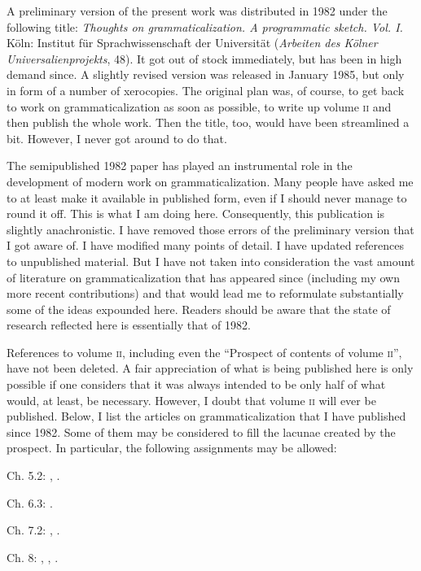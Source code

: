 
A preliminary version of the present work was distributed in 1982 under the following title: \textit{Thoughts on grammaticalization. A programmatic sketch. Vol. I.} Köln: Institut für Sprachwissenschaft der Universität (\textit{Arbeiten des Kölner Universalienprojekts}, 48). It got out of stock immediately, but has been in high demand since. A slightly revised version was released in January 1985, but only in form of a number of xerocopies. The original plan was, of course, to get back to work on grammaticalization as soon as possible, to write up volume \textsc{ii} and then publish the whole work. Then the title, too, would have been streamlined a bit. However, I never got around to do that.

The semipublished 1982 paper has played an instrumental role in the development of modern work on grammaticalization. Many people have asked me to at least make it available in published form, even if I should never manage to round it off. This is what I am doing here. Consequently, this publication is slightly anachronistic. I have removed those errors of the preliminary version that I got aware of. I have modified many points of detail. I have updated references to unpublished material. But I have not taken into consideration the vast amount of literature on grammaticalization that has appeared since (including my own more recent contributions) and that would lead me to reformulate substantially some of the ideas expounded here. Readers should be aware that the state of research reflected here is essentially that of 1982.

References to volume \textsc{ii}, including even the ``Prospect of contents of volume \textsc{ii}'', have not been deleted. A fair appreciation of what is being published here is only possible if one considers that it was always intended to be only half of what would, at least, be necessary. However, I doubt that volume \textsc{ii} will ever be published. Below, I list the articles on grammaticalization that I have published since 1982. Some of them may be considered to fill the lacunae created by the prospect. In particular, the following assignments may be allowed:

Ch. 5.2:  \citet{Lehmann1989a}, \citet{Lehmann2002}.

Ch. 6.3:  \citet{Lehmann1989b}.

Ch. 7.2:  \citet{Lehmann1985b}, \citet{Lehmann1986}.

Ch. 8:    \citet{Lehmann1985a}, \citet{Lehmann1987}, \citet{Lehmann1992}.

